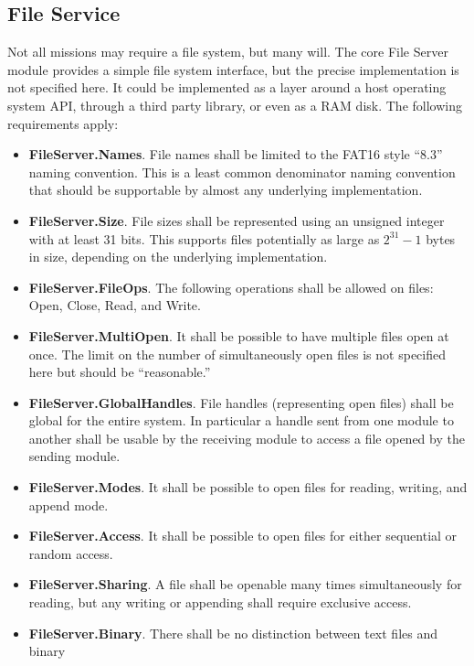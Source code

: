 \subsection{File Service}
\label{sec:file-service}

Not all missions may require a file system, but many will. The core File Server module provides
a simple file system interface, but the precise implementation is not specified here. It could
be implemented as a layer around a host operating system API, through a third party library, or
even as a RAM disk. The following requirements apply:

\begin{itemize}
\item \textbf{FileServer.Names}. File names shall be limited to the FAT16 style ``8.3'' naming
  convention. This is a least common denominator naming convention that should be supportable by
  almost any underlying implementation. 
\item \textbf{FileServer.Size}. File sizes shall be represented using an unsigned integer with
  at least 31 bits. This supports files potentially as large as $2^{31} - 1$ bytes in size,
  depending on the underlying implementation.
\item \textbf{FileServer.FileOps}. The following operations shall be allowed on files: Open,
  Close, Read, and Write.
\item \textbf{FileServer.MultiOpen}. It shall be possible to have multiple files open at once.
  The limit on the number of simultaneously open files is not specified here but should be
  ``reasonable.''
\item \textbf{FileServer.GlobalHandles}. File handles (representing open files) shall be global
  for the entire system. In particular a handle sent from one module to another shall be usable
  by the receiving module to access a file opened by the sending module.
\item \textbf{FileServer.Modes}. It shall be possible to open files for reading, writing, and
  append mode.
\item \textbf{FileServer.Access}. It shall be possible to open files for either sequential or
  random access.
\item \textbf{FileServer.Sharing}. A file shall be openable many times simultaneously for
  reading, but any writing or appending shall require exclusive access.
\item \textbf{FileServer.Binary}. There shall be no distinction between text files and binary

\end{itemize}

